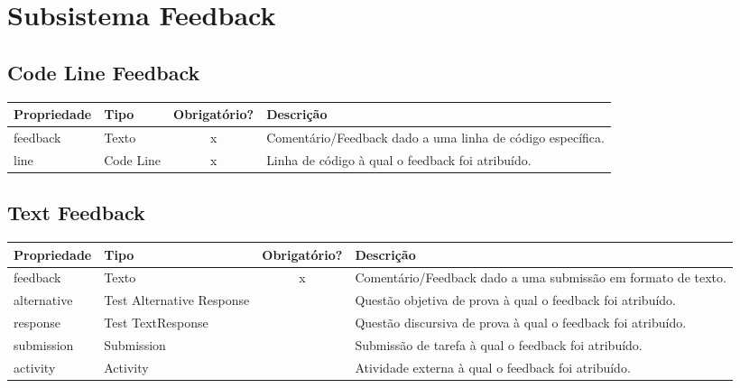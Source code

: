 \section{Subsistema Feedback}

\subsection{Code Line Feedback} \label{Code Line Feedback}
\begin{table}[H]
	\footnotesize
	\begin{tabularx}{\textwidth}{|X|X|c|p{7.8cm}|}   \hline \rowcolor[rgb]{0.8,0.8,0.8}
		
		\textbf{Propriedade} & \textbf{Tipo} & \textbf{Obrigatório?} & \centerline{\textbf{Descrição}} \\\hline  	
		
		feedback & Texto & x & Comentário/Feedback dado a uma linha de código específica. \\\hline	
		line & Code Line & x & Linha de código à qual o feedback foi atribuído. \\\hline			
		
	\end{tabularx}	
\end{table}


\subsection{Text Feedback} \label{Text Feedback}
\begin{table}[H]
	\footnotesize
	\noindent
	\begin{tabularx}{\textwidth}{|X|X|c|p{7.8cm}|}   \hline \rowcolor[rgb]{0.8,0.8,0.8}
		
		\textbf{Propriedade} & \textbf{Tipo} & \textbf{Obrigatório?} & \centerline{\textbf{Descrição}} \\\hline  	
		
		feedback & Texto & x & Comentário/Feedback dado a uma submissão em formato de texto. \\\hline	
		alternative & Test Alternative Response & {} & Questão objetiva de prova à qual o feedback foi atribuído. \\\hline	
		response & Test TextResponse & {} & Questão discursiva de prova à qual o feedback foi atribuído. \\\hline				
		submission & Submission & {} & Submissão de tarefa à qual o feedback foi atribuído. \\\hline	
		activity & Activity & {} & Atividade externa à qual o feedback foi atribuído. \\\hline	
	\end{tabularx}	
\end{table}

